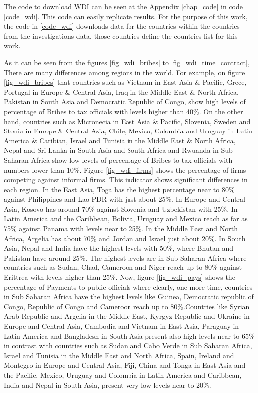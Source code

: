 The code to download WDI can be seen at the Appendix \ref{chap_code} in code \ref{code_wdi}. This code can easily replicate results. For the purpose of this work, the code in \ref{code_wdi} downloads data for the countries within the countries from the investigations data, those countries define the countries list for this work.

As it can be seen from the figures \ref{fig_wdi_bribes} to \ref{fig_wdi_time_contract}, There are many differences among regions in the world. 
For example, on figure \ref{fig_wdi_bribes} that countries such as Vietnam in East Asia \& Pacific, Grece, Portugal in Europe \& Central Asia, Iraq in the Middle East \& North Africa, Pakistan in South Asia and Democratic Republic of Congo, show high levels of percentage of Bribes to tax officials with levels higher than 40\%. On the other hand, countries such as Micronecia in East Asia \& Pacific, Slovenia, Sweden and Stonia in Europe \& Central Asia, Chile, Mexico, Colombia and Uruguay in Latin America \& Caribian, Israel and Tunisia in the Middle East \& North Africa, Nepal and Sri Lanka in South Asia and South Africa and Rwuanda in Sub-Saharan Africa show low levels of percentage of Bribes to tax officials with numbers lower than 10\%.
Figure \ref{fig_wdi_firms} shows the percentage of firms competing against informal firms. This indicator shows significant differences in each region. In the East Asia, Toga has the highest percentage near to 80\% against Philippines and Lao PDR with just about 25\%. In Europe and Central Asia, Kosovo has around 70\% against Slovenia and Uzbekistan with 25\%. In Latin America and the Caribbean, Bolivia, Uruguay and Mexico reach as far as 75\% against Panama with levels near to 25\%. In the Middle East and North Africa, Argelia has about 70\% and Jordan and Israel just about 20\%. In South Asia, Nepal and India have the highest levels with 50\%, where Bhutan and Pakistan have around 25\%. The highest levels are in Sub Saharan Africa where countries such as Sudan, Chad, Cameroon and Niger reach up to 80\% against Erittrea with levels higher than 25\%.
Now, figure \ref{fig_wdi_pays} shows the percentage of Payments to public officials where clearly, one more time, countries in Sub Saharan Africa have the highest levels like Guinea, Democratic republic of Congo, Republic of Congo and Cameroon reach up to 80\%.Countries like Syrian Arab Republic and Argelia in the Middle East, Kyrgyz Republic and Ukraine in Europe and Central Asia, Cambodia and Vietnam in East Asia, Paraguay in Latin America and Bangladesh in South Asia present also high levels near to 65\% in contrast with countries such as Sudan and Cabo Verde in Sub Saharan Africa, Israel and Tunisia in the Middle East and North Africa, Spain, Ireland and Montegro in Europe and Central Asia, Fiji, China and Tonga in East Asia and the Pacific, Mexico, Uruguay and Colombia in Latin America and Caribbean, India and Nepal in South Asia, present very low levels near to 20\%.
